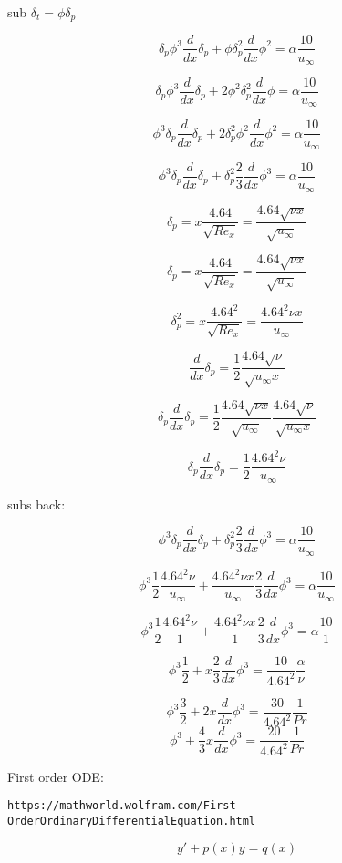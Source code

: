 \documentclass[11pt]{article}
\begin{document}
sub $\delta_t = \phi \delta_p$

$$ \delta_p \phi^3 \frac{d}{dx} \delta_p  + \phi \delta_p^2 \frac{d}{dx} \phi^2  = \alpha \frac{10}{  u_\infty }$$ 

$$ \delta_p \phi^3 \frac{d}{dx} \delta_p  + 2 \phi^2 \delta_p^2 \frac{d}{dx} \phi  = \alpha \frac{10}{  u_\infty }$$ 


$$  \phi^3 \delta_p \frac{d}{dx} \delta_p  + 2 \delta_p^2  \phi^2 \frac{d}{dx} \phi^2  = \alpha \frac{10}{  u_\infty }$$ 

$$  \phi^3 \delta_p \frac{d}{dx} \delta_p  +  \delta_p^2  \frac{2}{3} \frac{d}{dx} \phi^3  = \alpha \frac{10}{  u_\infty }$$ 

$$\delta_p = x \frac{4.64}{\sqrt{Re_x}} = \frac{4.64 \sqrt{\nu x}}{\sqrt{u_\infty}}$$

$$\delta_p = x \frac{4.64}{\sqrt{Re_x}} = \frac{4.64 \sqrt{\nu x}}{\sqrt{u_\infty}}$$

$$\delta_p^2 = x \frac{4.64^2}{\sqrt{Re_x}} = \frac{4.64^2 \nu x}{u_\infty}$$


$$\frac{d}{dx} \delta_p = \frac{1}{2} \frac{4.64 \sqrt{\nu}}{\sqrt{u_\infty x}}$$

$$\delta_p \frac{d}{dx} \delta_p = \frac{1}{2}  \frac{4.64 \sqrt{\nu x}}{\sqrt{u_\infty}} \frac{4.64 \sqrt{\nu}}{\sqrt{u_\infty x}}$$

$$\delta_p \frac{d}{dx} \delta_p = \frac{1}{2}  \frac{4.64^2 \nu}{u_\infty} $$

subs back:

$$  \phi^3 \delta_p \frac{d}{dx} \delta_p  +  \delta_p^2  \frac{2}{3} \frac{d}{dx} \phi^3  = \alpha \frac{10}{  u_\infty }$$ 

$$  \phi^3 \frac{1}{2}  \frac{4.64^2 \nu}{u_\infty}  + \frac{4.64^2 \nu x}{u_\infty} \frac{2}{3} \frac{d}{dx} \phi^3  = \alpha \frac{10}{  u_\infty }$$ 


$$  \phi^3 \frac{1}{2}  \frac{4.64^2 \nu}{1}  + \frac{4.64^2 \nu x}{1} \frac{2}{3} \frac{d}{dx} \phi^3  = \alpha \frac{10}{ 1 }$$ 

$$  \phi^3 \frac{1}{2}   + x \frac{2}{3} \frac{d}{dx} \phi^3  = \frac{ 10}{4.64^2} \frac{\alpha}{ \nu  }$$ 

$$  \phi^3 \frac{3}{2}   +2 x \frac{d}{dx} \phi^3  = \frac{30}{4.64^2} \frac{1}{Pr }$$ 
$$  \phi^3    + \frac{4}{3} x \frac{d}{dx} \phi^3  = \frac{20}{4.64^2} \frac{1}{Pr }$$ 



First order ODE:

\begin{verbatim}
https://mathworld.wolfram.com/First-OrderOrdinaryDifferentialEquation.html
\end{verbatim}
$$y' + p(x) y = q(x)$$
\end{document}
